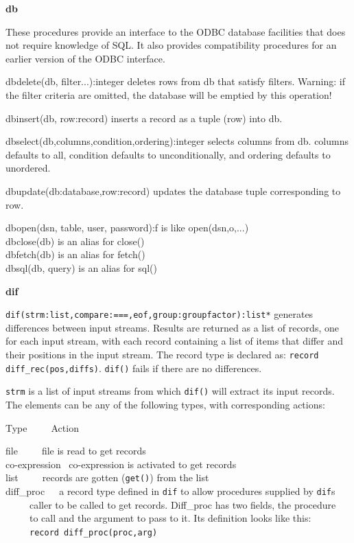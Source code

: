 {\sffamily\bfseries
db}

These procedures provide an interface to the ODBC database facilities
that does not require knowledge of SQL. It also provides compatibility
procedures for an earlier version of the ODBC interface.

dbdelete(db, filter...):integer deletes rows from db that satisfy
filters. Warning: if the filter criteria are omitted, the
database will be emptied by this operation!

dbinsert(db, row:record) inserts a record as a tuple (row) into db.

dbselect(db,columns,condition,ordering):integer selects columns from db.
columns defaults to {\textquotedbl}all{\textquotedbl}, condition
defaults to unconditionally, and ordering defaults to unordered.

\textsf{dbupdate(db:database,row:record)} updates the database tuple
corresponding to row.

dbopen(dsn, table, user, password):f is like
open(dsn,{\textquotedbl}o{\textquotedbl},...)\\
dbclose(db) is an alias for close()\\
dbfetch(db) is an alias for fetch()\\
dbsql(db, query) is an alias for sql()

{\sffamily\bfseries
dif}

\texttt{dif(strm:list,compare:{\textquotedbl}==={\textquotedbl},eof,group:groupfactor):list*}
generates differences between input streams. Results are
returned as a list of records, one for each input stream, with each
record containing a list of items that differ and their positions in
the input stream. The record type is declared as: \texttt{record
diff\_rec(pos,diffs)}. \texttt{dif()} fails if there are no
differences.

\texttt{strm} is a list of input streams from which \texttt{dif()} will
extract its input {\textquotedbl}records{\textquotedbl}. The elements
can be any of the following types, with corresponding actions:

Type\ \ \ \  \ Action

file\ \ \ \  \ file is {\textquotedbl}read{\textquotedbl} to get
records\\
co-expression \ co-expression is activated to get records\\
list\ \ \ \  \ records are {\textquotedbl}gotten{\textquotedbl}
(\texttt{get()}) from the list\\
diff\_proc\ \  \ a record type defined in \texttt{dif} to allow
procedures supplied by \texttt{dif}{\textquotesingle}s\\
 \ \ \ \  \ caller to be called to get records. Diff\_proc has two
fields, the procedure\\
 \ \ \ \  \ to call and the argument to pass to it. Its definition looks
like this:\\
 \ \ \ \  \ \texttt{record diff\_proc(proc,arg)}

